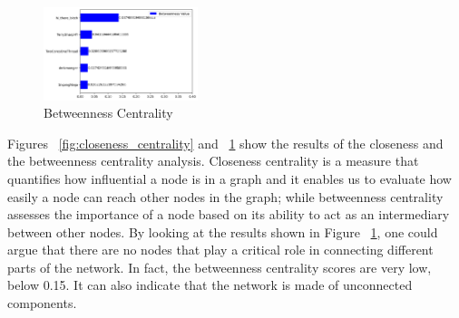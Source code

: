 \documentclass[sigchi]{acmart}
\begin{document}
\begin{figure}[htbp]
  \centering
  \includegraphics[width=0.4\textwidth]{betweenness.png}
  \caption{Betweenness Centrality}
  \label{fig:betwenness_centrality}
\end{figure}




Figures ~\ref{fig:closeness_centrality} and ~\ref{fig:betwenness_centrality} show the results of the closeness and the betweenness centrality analysis. 
Closeness centrality is a measure that quantifies how influential a node is in a graph and it enables us to evaluate how easily a node can reach other nodes in the graph; while betweenness centrality assesses the importance of a node based on its ability to act as an intermediary between other nodes.
By looking at the results shown in Figure ~\ref{fig:betwenness_centrality}, one could argue that there are no nodes that play a critical role in connecting different parts of the network. In fact, the betweenness centrality scores are very low, below 0.15. It can also indicate that the network is made of unconnected components.
\end{document}
